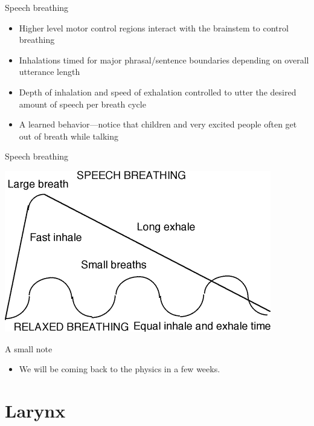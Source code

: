 \documentclass[professionalfonts]{beamer}
\begin{document}
\begin{frame}{Speech breathing}
    \begin{itemize}
        \item Higher level motor control regions interact with the brainstem to control breathing 
        \item Inhalations timed for major phrasal/sentence boundaries depending on overall utterance length 
        \item Depth of inhalation and speed of exhalation controlled to utter the desired amount of speech per breath cycle 
        \item A learned behavior—notice that children and very excited people often get out of breath while talking 
    \end{itemize}
\end{frame}

\begin{frame}{Speech breathing}
    \begin{center}
        \includegraphics[width = .75\textwidth]{figs/SpeechBreathing.png}
    \end{center}
\end{frame}

\begin{frame}{A small note}
    \begin{itemize}
        \item We will be coming back to the physics in a few weeks. 
    \end{itemize}
\end{frame}

\section*{Larynx}
\end{document}
